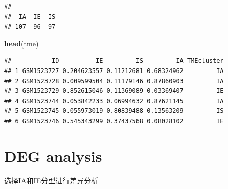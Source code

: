 \documentclass[
  12pt,
]{book}
\newenvironment{Shaded}{\begin{snugshade}}{\end{snugshade}}
\newcommand{\AttributeTok}[1]{\textcolor[rgb]{0.13,0.29,0.53}{#1}}
\newcommand{\ConstantTok}[1]{\textcolor[rgb]{0.56,0.35,0.01}{#1}}
\newcommand{\FloatTok}[1]{\textcolor[rgb]{0.00,0.00,0.81}{#1}}
\newcommand{\FunctionTok}[1]{\textcolor[rgb]{0.13,0.29,0.53}{\textbf{#1}}}
\newcommand{\NormalTok}[1]{#1}
\newcommand{\OtherTok}[1]{\textcolor[rgb]{0.56,0.35,0.01}{#1}}
\newcommand{\SpecialCharTok}[1]{\textcolor[rgb]{0.81,0.36,0.00}{\textbf{#1}}}
\newcommand{\StringTok}[1]{\textcolor[rgb]{0.31,0.60,0.02}{#1}}
\begin{document}
\begin{verbatim}
## 
##  IA  IE  IS 
## 107  96  97
\end{verbatim}

\begin{Shaded}
\begin{Highlighting}[]
\FunctionTok{head}\NormalTok{(tme)}
\end{Highlighting}
\end{Shaded}

\begin{verbatim}
##           ID          IE         IS         IA TMEcluster
## 1 GSM1523727 0.204623557 0.11212681 0.68324962         IA
## 2 GSM1523728 0.009599504 0.11179146 0.87860903         IA
## 3 GSM1523729 0.852615046 0.11369089 0.03369407         IE
## 4 GSM1523744 0.053842233 0.06994632 0.87621145         IA
## 5 GSM1523745 0.055973019 0.80839488 0.13563209         IS
## 6 GSM1523746 0.545343299 0.37437568 0.08028102         IE
\end{verbatim}

\hypertarget{deg-analysis}{%
\section{DEG analysis}\label{deg-analysis}}

选择IA和IE分型进行差异分析

\begin{Shaded}
\end{Shaded}
\end{document}
